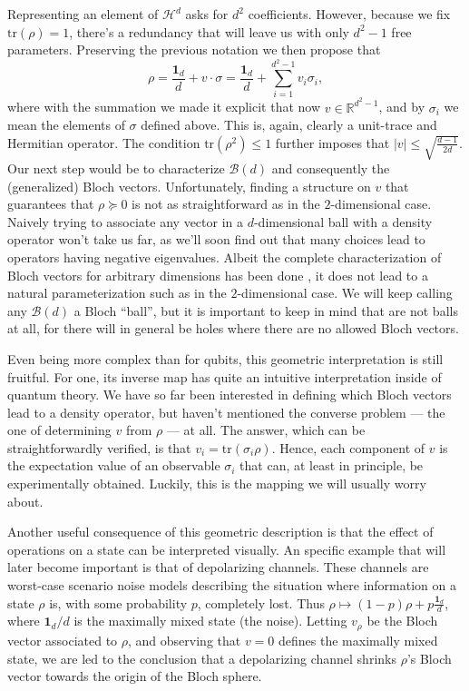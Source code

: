 		Representing an element of $\mathcal{H}^d$ asks for $d^2$ coefficients. However, because we fix $\text{tr}(\rho) = 1$, there's a redundancy that will leave us with only $d^2 - 1$ free parameters. Preserving the previous notation we then propose that
		\begin{equation}
			\rho = \frac{\mathbf{1}_d}{d} + v \cdot \sigma = \frac{\mathbf{1}_d}{d} + \sum_{i = 1}^{d^2 - 1} v_i \sigma_i ,
			\label{eq:gell-mann-representation}
		\end{equation}
		where with the summation we made it explicit that now $v \in \mathbb{R}^{d^2 - 1}$, and by $\sigma_i$ we mean the elements of $\sigma$ defined above. This is, again, clearly a unit-trace and Hermitian operator. The condition $\text{tr}(\rho^2) \leq 1$ further imposes that $\lvert v \rvert \leq \sqrt{\frac{d - 1}{2d}}$. Our next step would be to characterize $\mathcal{B}(d)$ and consequently the (generalized) Bloch vectors. Unfortunately, finding a structure on $v$ that guarantees that $\rho \succeq 0$ is not as straightforward as in the $2$-dimensional case. Naively trying to associate any vector in a $d$-dimensional ball with a density operator won't take us far, as we'll soon find out that many choices lead to operators having negative eigenvalues. Albeit the complete characterization of Bloch vectors for arbitrary dimensions has been done \cite{kimura_2003_bloch}, it does not lead to a natural parameterization such as in the $2$-dimensional case. We will keep calling any $\mathcal{B}(d)$ a Bloch ``ball'', but it is important to keep in mind that are not balls at all, for there will in general be holes where there are no allowed Bloch vectors.

		Even being more complex than for qubits, this geometric interpretation is still fruitful. For one, its inverse map has quite an intuitive interpretation inside of quantum theory. We have so far been interested in defining which Bloch vectors lead to a density operator, but haven't mentioned the converse problem --- the one of determining $v$ from $\rho$ --- at all. The answer, which can be straightforwardly verified, is that $v_i = \text{tr}(\sigma_i \rho)$. Hence, each component of $v$ is the expectation value of an observable $\sigma_i$ that can, at least in principle, be experimentally obtained. Luckily, this is the mapping we will usually worry about.

		Another useful consequence of this geometric description is that the effect of operations on a state can be interpreted visually. An specific example that will later become important is that of depolarizing channels. These channels are worst-case scenario noise models describing the situation where information on a state $\rho$ is, with some probability $p$, completely lost. Thus $\rho \mapsto (1 - p) \rho + p \frac{\mathbf{1}_d}{d}$, where $\mathbf{1}_d/d$ is the maximally mixed state (the noise). Letting $v_\rho$ be the Bloch vector associated to $\rho$, and observing that $v = 0$ defines the maximally mixed state, we are led to the conclusion that a depolarizing channel shrinks $\rho$'s Bloch vector towards the origin of the Bloch sphere.

